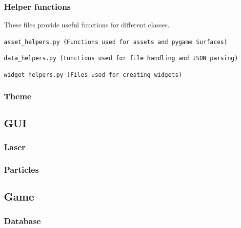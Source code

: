 \documentclass[../main/main.tex]{subfiles}
\begin{document}
\subsubsection{Helper functions}
These files provide useful functions for different classes.

\noindent\verb|asset_helpers.py (Functions used for assets and pygame Surfaces)|


\bigskip
\noindent\verb|data_helpers.py (Functions used for file handling and JSON parsing)|



\bigskip
\noindent\verb|widget_helpers.py (Files used for creating widgets)|


\subsubsection{Theme}

\subsection{GUI}
\subsubsection{Laser}
\subsubsection{Particles}

\subsection{Game}
\subsubsection{Database}
\end{document}
